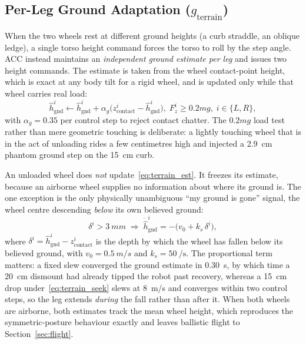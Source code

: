 \documentclass[a4paper,fleqn]{cas-dc}
\begin{document}
\subsection{Per-Leg Ground Adaptation ($g_{\text{terrain}}$)}
\label{sec:terrain}

When the two wheels rest at different ground heights (a curb straddle, an oblique ledge), a single torso height command forces the torso to roll by the
step angle. ACC instead maintains an \emph{independent ground estimate per leg}
and issues two height commands. The estimate is taken from the wheel
contact-point height, which is exact at any body tilt for a rigid wheel, and is
updated only while that wheel carries real load:
\begin{equation}
\hat{h}_{\text{gnd}}^{i} \leftarrow \hat{h}_{\text{gnd}}^{i}
+ \alpha_g\big(z_{\text{contact}}^{i} - \hat{h}_{\text{gnd}}^{i}\big),
\; F_z^{i} \geq 0.2mg, \; i \in \{L,R\},
\label{eq:terrain_est}
\end{equation}
with $\alpha_g = 0.35$ per control step to reject contact chatter. The
$0.2mg$ load test rather than mere geometric touching is deliberate: a lightly
touching wheel that is in the act of unloading rides a few centimetres high and
injected a \SI{+2.9}{cm} phantom ground step on the \SI{15}{cm} curb.

An unloaded wheel does \emph{not} update~\eqref{eq:terrain_est}. It freezes its
estimate, because an airborne wheel supplies no information about where its
ground is. The one exception is the only physically unambiguous
``my ground is gone'' signal, the wheel centre descending \emph{below} its own
believed ground:
\begin{equation}
\delta^{i} > \SI{3}{mm}
\;\Rightarrow\;
\dot{\hat{h}}_{\text{gnd}}^{i} = -\big(v_0 + k_s \,\delta^{i}\big),
\label{eq:terrain_seek}
\end{equation}
where $\delta^{i} = \hat{h}_{\text{gnd}}^{i} - z_{\text{contact}}^{i}$ is the
depth by which the wheel has fallen below its believed ground,
with $v_0 = \SI{0.5}{m/s}$ and $k_s = \SI{50}{\per\second}$. The
proportional term matters: a fixed slew converged the ground estimate in
\SI{0.30}{s}, by which time a \SI{20}{cm} dismount had already tipped the robot
past recovery, whereas a \SI{15}{cm} drop under~\eqref{eq:terrain_seek} slews at
\SI{8}{m/s} and converges within two control steps, so the leg extends
\emph{during} the fall rather than after it. When both wheels are airborne, both
estimates track the mean wheel height, which reproduces the symmetric-posture
behaviour exactly and leaves ballistic flight to
Section~\ref{sec:flight}.
\end{document}
